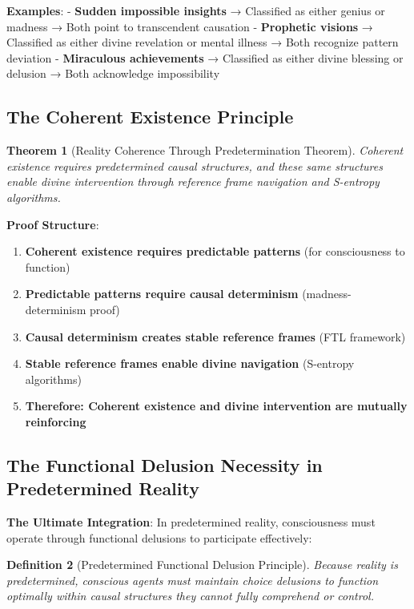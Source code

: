 \documentclass[12pt,a4paper]{article}
\newtheorem{theorem}{Theorem}[section]
\newtheorem{definition}[theorem]{Definition}
\begin{document}
\textbf{Examples}:
- \textbf{Sudden impossible insights} → Classified as either genius or madness → Both point to transcendent causation
- \textbf{Prophetic visions} → Classified as either divine revelation or mental illness → Both recognize pattern deviation
- \textbf{Miraculous achievements} → Classified as either divine blessing or delusion → Both acknowledge impossibility

\subsection{The Coherent Existence Principle}

\begin{theorem}[Reality Coherence Through Predetermination Theorem]
Coherent existence requires predetermined causal structures, and these same structures enable divine intervention through reference frame navigation and S-entropy algorithms.
\end{theorem}

\textbf{Proof Structure}:
\begin{enumerate}
\item \textbf{Coherent existence requires predictable patterns} (for consciousness to function)
\item \textbf{Predictable patterns require causal determinism} (madness-determinism proof)
\item \textbf{Causal determinism creates stable reference frames} (FTL framework)
\item \textbf{Stable reference frames enable divine navigation} (S-entropy algorithms)
\item \textbf{Therefore: Coherent existence and divine intervention are mutually reinforcing}
\end{enumerate}

\subsection{The Functional Delusion Necessity in Predetermined Reality}

\textbf{The Ultimate Integration}: In predetermined reality, consciousness must operate through functional delusions to participate effectively:

\begin{definition}[Predetermined Functional Delusion Principle]
Because reality is predetermined, conscious agents must maintain choice delusions to function optimally within causal structures they cannot fully comprehend or control.
\end{definition}
\end{document}
